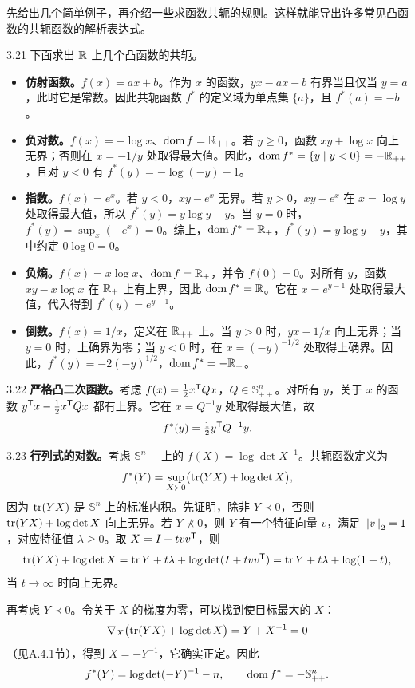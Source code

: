 先给出几个简单例子，再介绍一些求函数共轭的规则。这样就能导出许多常见凸函数的共轭函数的解析表达式。
\begin{origexample}{3.21}
下面求出 $\mathbb R$ 上几个凸函数的共轭。
\begin{itemize}
\item \textbf{仿射函数。}$f(x)=ax+b$。作为 $x$ 的函数，$yx-ax-b$ 有界当且仅当 $y=a$，此时它是常数。因此共轭函数 $f^*$ 的定义域为单点集 $\{a\}$，且 $f^*(a)=-b$。
\item \textbf{负对数。}$f(x)=-\log x$、$\operatorname{dom} f=\mathbb R_{++}$。若 $y\geq0$，函数 $xy+\log x$ 向上无界；否则在 $x=-1/y$ 处取得最大值。因此，$\operatorname{dom} f^*=\{y\mid y<0\}=-\mathbb R_{++}$，且对 $y<0$ 有 $f^*(y)=-\log(-y)-1$。
\item \textbf{指数。}$f(x)=e^x$。若 $y<0$，$xy-e^x$ 无界。若 $y>0$，$xy-e^x$ 在 $x=\log y$ 处取得最大值，所以 $f^*(y)=y\log y-y$。当 $y=0$ 时，
$f^*(y)=\sup_x(-e^x)=0$。综上，$\operatorname{dom} f^*=\mathbb R_+$，$f^*(y)=y\log y-y$，其中约定 $0\log0=0$。
\item \textbf{负熵。}$f(x)=x\log x$、$\operatorname{dom} f=\mathbb R_+$，并令 $f(0)=0$。对所有 $y$，函数 $xy-x\log x$ 在 $\mathbb R_+$ 上有上界，因此 $\operatorname{dom} f^*=\mathbb R$。它在 $x=e^{y-1}$ 处取得最大值，代入得到 $f^*(y)=e^{y-1}$。
\item \textbf{倒数。}$f(x)=1/x$，定义在 $\mathbb R_{++}$ 上。当 $y>0$ 时，$yx-1/x$ 向上无界；当 $y=0$ 时，上确界为零；当 $y<0$ 时，在 $x=(-y)^{-1/2}$ 处取得上确界。因此，$f^*(y)=-2(-y)^{1/2}$，$\operatorname{dom} f^*=-\mathbb R_+$。
\end{itemize}
\end{origexample}
\begin{origexample}{3.22}
\textbf{严格凸二次函数。}考虑 $f(x)=\tfrac12x^\mathsf T Qx$，$Q\in\mathbb S_{++}^n$。对所有 $y$，关于 $x$ 的函数 $y^\mathsf T x-\tfrac12x^\mathsf T Qx$ 都有上界。它在 $x=Q^{-1}y$ 处取得最大值，故
\[f^*(y)=\tfrac12y^\mathsf T Q^{-1}y.\]
\end{origexample}
\begin{origexample}{3.23}
\textbf{行列式的对数。}考虑 $\mathbb S_{++}^n$ 上的 $f(X)=\log\det X^{-1}$。共轭函数定义为
\[f^*(Y)=\sup_{X\succ0}\bigl(\operatorname{tr}(YX)+\log\det X\bigr),\]
因为 $\operatorname{tr}(YX)$ 是 $\mathbb S^n$ 上的标准内积。先证明，除非 $Y\prec0$，否则 $\operatorname{tr}(YX)+\log\det X$ 向上无界。若 $Y\not\prec0$，则 $Y$ 有一个特征向量 $v$，满足 $\left\lVert v\right\rVert_2=1$，对应特征值 $\lambda\geq0$。取 $X=I+tvv^\mathsf T$，则
\[
 \operatorname{tr}(YX)+\log\det X=\operatorname{tr} Y+t\lambda+\log\det(I+tvv^\mathsf T)
 =\operatorname{tr} Y+t\lambda+\log(1+t),
\]
当 $t\to\infty$ 时向上无界。

再考虑 $Y\prec0$。令关于 $X$ 的梯度为零，可以找到使目标最大的 $X$：
\[\nabla_X\bigl(\operatorname{tr}(YX)+\log\det X\bigr)=Y+X^{-1}=0\]
（见A.4.1节），得到 $X=-Y^{-1}$，它确实正定。因此
\[f^*(Y)=\log\det(-Y)^{-1}-n,\qquad\operatorname{dom} f^*=-\mathbb S_{++}^n.\]
\end{origexample}
